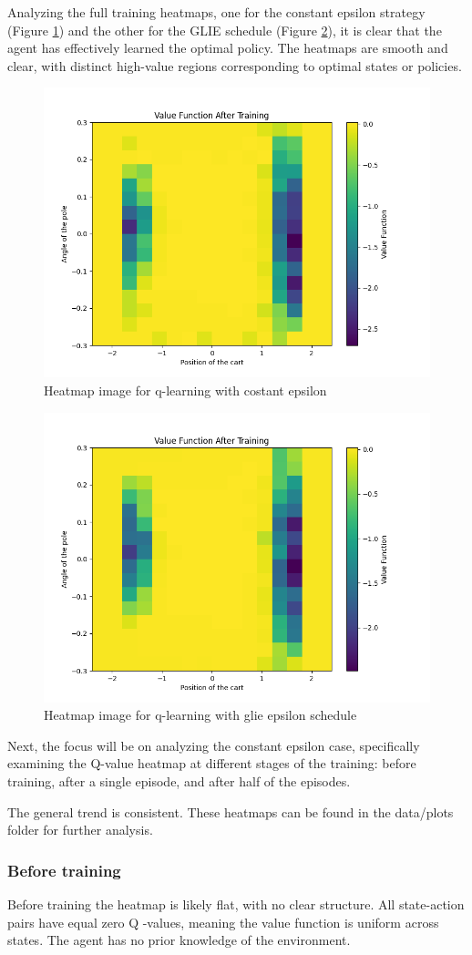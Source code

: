 \documentclass{article}
\begin{document}
Analyzing  the full training heatmaps, one for the constant epsilon strategy (Figure  \ref{fig:heatmap_costant_full}) and the other for the GLIE schedule (Figure \ref{fig:heatmap_glie_full}), it is clear that the agent has effectively learned the optimal policy. The heatmaps are smooth and clear, with distinct high-value regions corresponding to optimal states or policies. 

\begin{figure}[h]
	\centering
	\includegraphics[width=0.5\linewidth]{../data/plot/heatmap_full_training_constant_0.2.png}
	\caption{Heatmap image for q-learning with costant epsilon}
	\label{fig:heatmap_costant_full}
\end{figure}
\begin{figure}[h]
	\centering
	\includegraphics[width=0.5\linewidth]{../data/plot/heatmap_full_training_GLIE.png}
	\caption{Heatmap image for q-learning with glie epsilon schedule}
	\label{fig:heatmap_glie_full}
\end{figure}

Next, the focus will be on analyzing the constant epsilon case, specifically examining the Q-value heatmap at different stages of the training: before training, after a single episode, and after half of the episodes.

The general trend is consistent. These heatmaps can be found in the data/plots folder for further analysis.


\subsubsection{Before training}
Before training the heatmap is likely flat, with no clear structure. All state-action pairs have equal zero Q -values, meaning  the value function is uniform across states. The agent has no prior knowledge of the environment.
\end{document}
